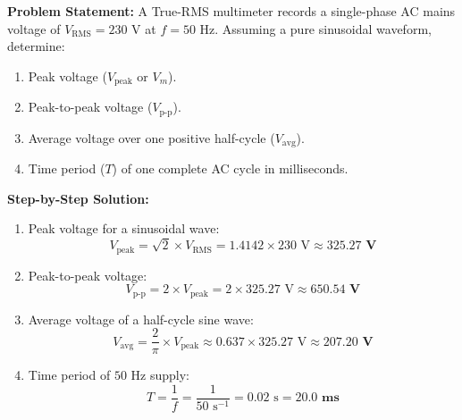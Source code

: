 \begin{tcolorbox}[colback=white,colframe=navyblue,title=\textbf{Problem 3: AC Waveform Parameter Calculations}]
\textbf{Problem Statement:} A True-RMS multimeter records a single-phase AC mains voltage of $V_{\text{RMS}} = 230\text{ V}$ at $f = 50\text{ Hz}$. Assuming a pure sinusoidal waveform, determine:
\begin{enumerate}[label=(\alph*),leftmargin=*]
    \item Peak voltage ($V_{\text{peak}}$ or $V_m$).
    \item Peak-to-peak voltage ($V_{\text{p-p}}$).
    \item Average voltage over one positive half-cycle ($V_{\text{avg}}$).
    \item Time period ($T$) of one complete AC cycle in milliseconds.
\end{enumerate}
\textbf{Step-by-Step Solution:}
\begin{enumerate}[label=(\alph*),leftmargin=*]
    \item Peak voltage for a sinusoidal wave:
    \[
    V_{\text{peak}} = \sqrt{2} \times V_{\text{RMS}} = 1.4142 \times 230\text{ V} \approx \mathbf{325.27\text{ V}}
    \]
    \item Peak-to-peak voltage:
    \[
    V_{\text{p-p}} = 2 \times V_{\text{peak}} = 2 \times 325.27\text{ V} \approx \mathbf{650.54\text{ V}}
    \]
    \item Average voltage of a half-cycle sine wave:
    \[
    V_{\text{avg}} = \frac{2}{\pi} \times V_{\text{peak}} \approx 0.637 \times 325.27\text{ V} \approx \mathbf{207.20\text{ V}}
    \]
    \item Time period of $50\text{ Hz}$ supply:
    \[
    T = \frac{1}{f} = \frac{1}{50\text{ s}^{-1}} = 0.02\text{ s} = \mathbf{20.0\text{ ms}}
    \]
\end{enumerate}
\end{tcolorbox}

